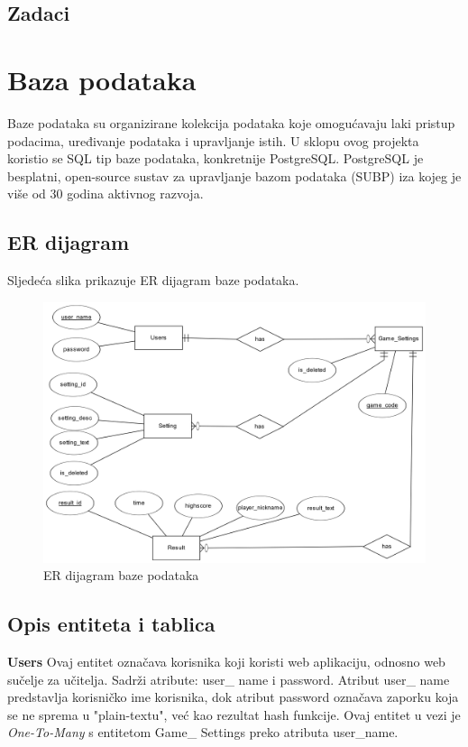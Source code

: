 \documentclass[times, utf8, zavrsni]{fer}
\begin{document}
	\section{Zadaci}
	
	
	
	
	

\chapter{Baza podataka}
	Baze podataka su organizirane kolekcija podataka koje omogućavaju laki pristup podacima, uređivanje podataka i upravljanje istih. U sklopu ovog projekta koristio se
	SQL tip baze podataka, konkretnije PostgreSQL. PostgreSQL je besplatni, open-source sustav za upravljanje bazom podataka (SUBP) iza kojeg je više od 30 godina aktivnog razvoja.
	
	
	\section{ER dijagram}
		Sljedeća slika prikazuje ER dijagram baze podataka.
		\begin{figure}[H]
			\includegraphics[width=\linewidth]{"slike/ER.png"} 
			\centering
			\caption{ER dijagram baze podataka}
			\label{fig:erdijagram}
		\end{figure}

	
	\section{Opis entiteta i tablica}
			\textbf {Users} \hspace{5mm}
			{Ovaj entitet označava korisnika koji koristi web aplikaciju, odnosno web sučelje za učitelja. Sadrži atribute: user\_ name i password.
			Atribut user\_ name predstavlja korisničko ime korisnika, dok atribut password označava zaporku koja se ne sprema u "plain-textu", već kao 
			rezultat hash funkcije.
			Ovaj entitet u vezi je \textit{One-To-Many} s entitetom Game\_ Settings preko atributa user\_name.}
				
\end{document}
